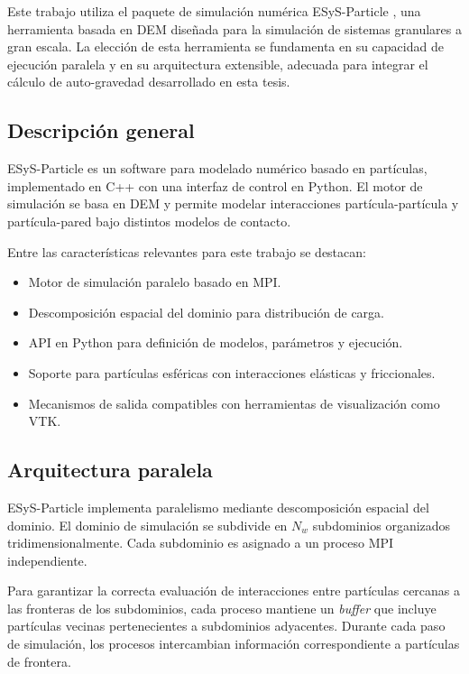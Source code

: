 \documentclass[a4paper,11pt]{book}
\begin{document}
Este trabajo utiliza el paquete de simulación numérica ESyS-Particle \cite{23}, una herramienta basada en DEM diseñada para la simulación de sistemas granulares a gran escala. La elección de esta herramienta se fundamenta en su capacidad de ejecución paralela y en su arquitectura extensible, adecuada para integrar el cálculo de auto-gravedad desarrollado en esta tesis.

\subsection{Descripción general}

ESyS-Particle es un software para modelado numérico basado en partículas, implementado en C++ con una interfaz de control en Python. El motor de simulación se basa en DEM y permite modelar interacciones partícula-partícula y partícula-pared bajo distintos modelos de contacto.

Entre las características relevantes para este trabajo se destacan:

\begin{itemize}
	\item Motor de simulación paralelo basado en MPI.
	\item Descomposición espacial del dominio para distribución de carga.
	\item API en Python para definición de modelos, parámetros y ejecución.
	\item Soporte para partículas esféricas con interacciones elásticas y friccionales.
	\item Mecanismos de salida compatibles con herramientas de visualización como VTK.
\end{itemize}

\subsection{Arquitectura paralela}

ESyS-Particle implementa paralelismo mediante descomposición espacial del dominio. El dominio de simulación se subdivide en $N_w$ subdominios organizados tridimensionalmente. Cada subdominio es asignado a un proceso MPI independiente.

Para garantizar la correcta evaluación de interacciones entre partículas cercanas a las fronteras de los subdominios, cada proceso mantiene un \textit{buffer} que incluye partículas vecinas pertenecientes a subdominios adyacentes. Durante cada paso de simulación, los procesos intercambian información correspondiente a partículas de frontera.
\end{document}
